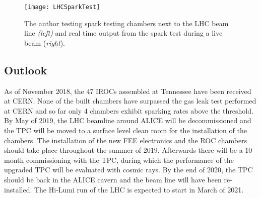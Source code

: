 \begin{figure}[h]
\texttt{[image: LHCSparkTest]}
\centering
\caption{The author testing spark testing chambers next to the LHC beam line \textit{(left)} and real time output from the spark test during a live beam (\textit{right}). }
\label{fig:LHCspark}
\end{figure}





\subsection{Outlook}

As of November 2018, the 47 IROCs assembled at Tennessee have been received at CERN.  None of the built chambers have surpassed the gas leak test performed at CERN and so far only 4 chambers exhibit sparking rates above the threshold.  By May of 2019, the LHC beamline around ALICE will be decommissioned and the TPC will be moved to a surface level clean room for the installation of the chambers.  The installation of the new FEE electronics and the ROC chambers should take place throughout the summer of 2019.  Afterwards there will be a 10 month commissioning with the TPC, during which the performance of the upgraded TPC will be evaluated with cosmic rays.  By the end of 2020, the TPC should be back in the ALICE cavern and the beam line will have been re-installed.  The Hi-Lumi run of the LHC is expected to start in March of 2021.





